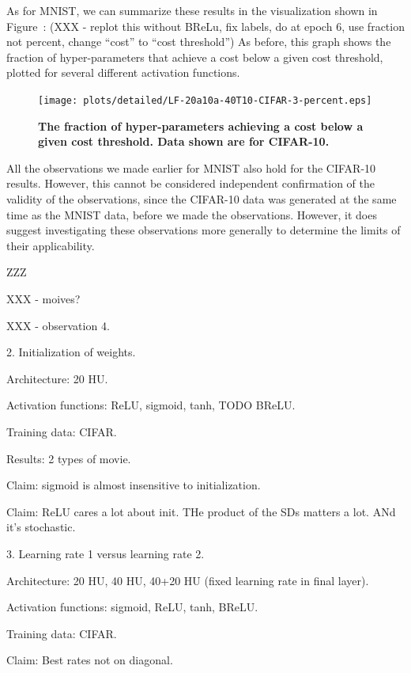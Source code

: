 \documentclass[10pt]{article}
\begin{document}
As for MNIST, we can summarize these results in the visualization
shown in Figure~\label{fig:fraction_CIFAR}: (XXX - replot this without
BReLu, fix labels, do at epoch 6, use fraction not percent, change
``cost'' to ``cost threshold'') As before, this graph shows the
fraction of hyper-parameters that achieve a cost below a given cost
threshold, plotted for several different activation functions.

\begin{figure}[!ht]
\begin{center}
\texttt{[image: plots/detailed/LF-20a10a-40T10-CIFAR-3-percent.eps]}
\end{center}
\caption{ {\bf The fraction of hyper-parameters achieving a cost below
    a given cost threshold.  Data shown are for CIFAR-10.}}
\label{fig:fraction_CIFAR}
\end{figure}


All the observations we made earlier for MNIST also hold for the
CIFAR-10 results.  However, this cannot be considered independent
confirmation of the validity of the observations, since the CIFAR-10
data was generated at the same time as the MNIST data, before we made
the observations.  However, it does suggest investigating these
observations more generally to determine the limits of their
applicability.

ZZZ


XXX - moives?

XXX - observation 4.


2. Initialization of weights.

Architecture: 20 HU.

Activation functions: ReLU, sigmoid, tanh, TODO BReLU.

Training data: CIFAR.

Results: 2 types of movie. 

Claim: sigmoid is almost insensitive to initialization.

Claim: ReLU cares a lot about init.  THe product of the SDs matters a
lot.  ANd it's stochastic.




3. Learning rate 1 versus learning rate 2.

Architecture: 20 HU, 40 HU, 40+20 HU (fixed learning rate in final
layer).

Activation functions: sigmoid, ReLU, tanh, BReLU.

Training data: CIFAR.

Claim: Best rates not on diagonal.
\end{document}
